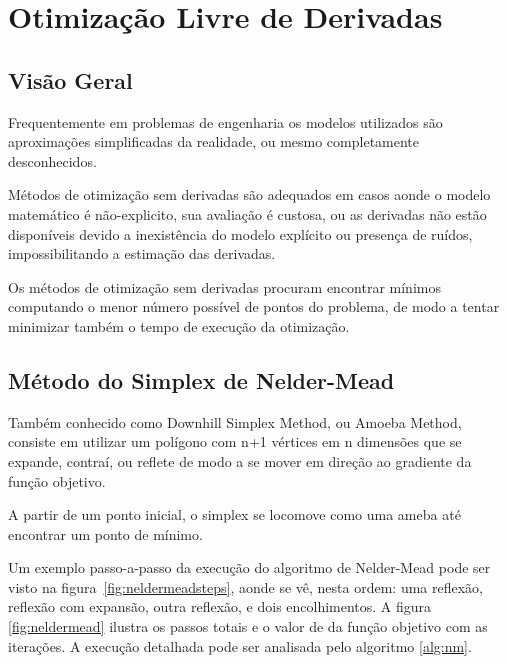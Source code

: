 \chapter{Otimização Livre de Derivadas} \label{chap:3}


\section{Visão Geral}

Frequentemente em problemas de engenharia os modelos utilizados são aproximações simplificadas da realidade, ou mesmo completamente desconhecidos.

Métodos de otimização sem derivadas são adequados em casos aonde o modelo matemático é não-explicito, sua avaliação é custosa, ou as derivadas não estão disponíveis devido a inexistência do modelo explícito ou presença de ruídos, impossibilitando a estimação das derivadas.

Os métodos de otimização sem derivadas procuram encontrar mínimos computando o menor número possível de pontos do problema, de modo a tentar minimizar também o tempo de execução da otimização.



\section{Método do Simplex de Nelder-Mead}

Também conhecido como Downhill Simplex Method, ou Amoeba Method, consiste em utilizar um polígono com n+1 vértices em n dimensões que se expande, contraí, ou reflete de modo a se mover em direção ao gradiente da função objetivo.

A partir de um ponto inicial, o simplex se locomove como uma ameba até encontrar um ponto de mínimo.


Um exemplo passo-a-passo da execução do algoritmo de Nelder-Mead pode ser visto na figura~\ref{fig:neldermeadsteps}, aonde se vê, nesta ordem: uma reflexão, reflexão com expansão, outra reflexão, e dois encolhimentos. 
%
A figura \ref{fig:neldermead} ilustra os passos totais e o valor de da função objetivo com as iterações.
%
A execução detalhada pode ser analisada pelo algoritmo \ref{alg:nm}.


